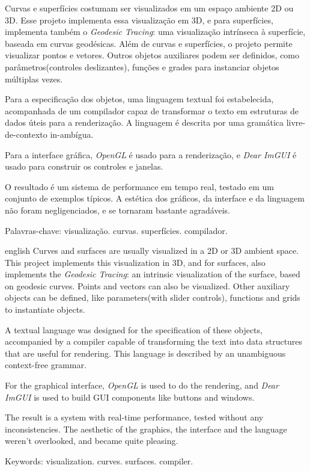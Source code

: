 \setlength{\absparsep}{18pt} 
\begin{resumo}[Resumo]
Curvas e superfícies costumam ser visualizados em um espaço ambiente 2D ou 3D.
Esse projeto implementa essa visualização em 3D, e para superfícies,
implementa também o \textit{Geodesic Tracing}: uma visualização intrínseca à
superfície, baseada em curvas geodésicas. Além de curvas e superfícies,
o projeto permite visualizar pontos e vetores. Outros objetos auxiliares podem ser
definidos, como parâmetros(controles deslizantes), funções e grades para
instanciar objetos múltiplas vezes.

Para a especificação dos objetos, uma linguagem textual foi estabelecida,
acompanhada de um compilador capaz de transformar o texto em estruturas de dados
úteis para a renderização. A linguagem é descrita por uma gramática livre-de-contexto
in-ambígua.

Para a interface gráfica, \textit{OpenGL} é usado para a renderização,
e \textit{Dear ImGUI} é usado para construir os controles e janelas.

O resultado é um sistema de performance em tempo real, testado 
em um conjunto de exemplos típicos. A estética dos gráficos, da interface e da
linguagem não foram negligenciados, e se tornaram bastante agradáveis.

 Palavras-chave: visualização. curvas. superfícies. compilador.
\end{resumo}

\begin{resumo}[Abstract]
\begin{otherlanguage*}{english}
Curves and surfaces are usually visualized in a 2D or 3D ambient space.
This project implements this visualization in 3D, and for surfaces, also
implements the \textit{Geodesic Tracing}: an intrinsic visualization of the surface,
based on geodesic curves. Points and vectors can also be visualized.
Other auxiliary objects can be defined, like parameters(with slider controls),
functions and grids to instantiate objects.

A textual language was designed for the specification of these objects,
accompanied by a compiler capable of transforming the text into data structures
that are useful for rendering. This language is described by an unambiguous context-free grammar.

For the graphical interface, \textit{OpenGL} is used to do the rendering,
and \textit{Dear ImGUI} is used to build GUI components like buttons and windows.

The result is a system with real-time performance, tested without any inconsistencies.
The aesthetic of the graphics, the interface and the language weren't
overlooked, and became quite pleasing.

 Keywords: visualization. curves. surfaces. compiler.
\end{otherlanguage*}
\end{resumo}
